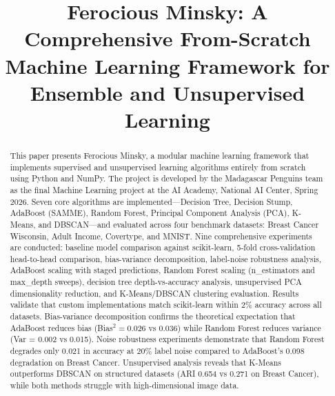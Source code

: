 \documentclass[conference,12pt]{IEEEtran}
\begin{document}
\title{Ferocious Minsky: A Comprehensive From-Scratch Machine Learning Framework for Ensemble and Unsupervised Learning}

\author{
}

\maketitle

\begin{abstract}
This paper presents Ferocious Minsky, a modular machine learning framework that implements supervised and unsupervised learning algorithms entirely from scratch using Python and NumPy. The project is developed by the Madagascar Penguins team as the final Machine Learning project at the AI Academy, National AI Center, Spring 2026. Seven core algorithms are implemented---Decision Tree, Decision Stump, AdaBoost (SAMME), Random Forest, Principal Component Analysis (PCA), K-Means, and DBSCAN---and evaluated across four benchmark datasets: Breast Cancer Wisconsin, Adult Income, Covertype, and MNIST. Nine comprehensive experiments are conducted: baseline model comparison against scikit-learn, 5-fold cross-validation head-to-head comparison, bias-variance decomposition, label-noise robustness analysis, AdaBoost scaling with staged predictions, Random Forest scaling (n\_estimators and max\_depth sweeps), decision tree depth-vs-accuracy analysis, unsupervised PCA dimensionality reduction, and K-Means/DBSCAN clustering evaluation. Results validate that custom implementations match scikit-learn within 2\% accuracy across all datasets. Bias-variance decomposition confirms the theoretical expectation that AdaBoost reduces bias (Bias$^2 = 0.026$ vs 0.036) while Random Forest reduces variance (Var = 0.002 vs 0.015). Noise robustness experiments demonstrate that Random Forest degrades only 0.021 in accuracy at 20\% label noise compared to AdaBoost's 0.098 degradation on Breast Cancer. Unsupervised analysis reveals that K-Means outperforms DBSCAN on structured datasets (ARI 0.654 vs 0.271 on Breast Cancer), while both methods struggle with high-dimensional image data.
\end{abstract}
\end{document}

